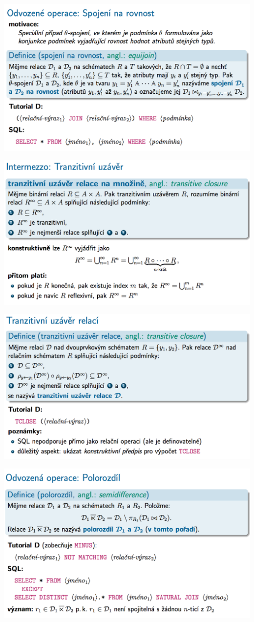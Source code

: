 \documentclass[10pt,a4paper]{article}
\begin{document}
	\includegraphics[scale=0.4]{img/55}
	
	\includegraphics[scale=0.4]{img/56}
	
	\includegraphics[scale=0.4]{img/57}
	
	\includegraphics[scale=0.4]{img/58}
	
\end{document}
